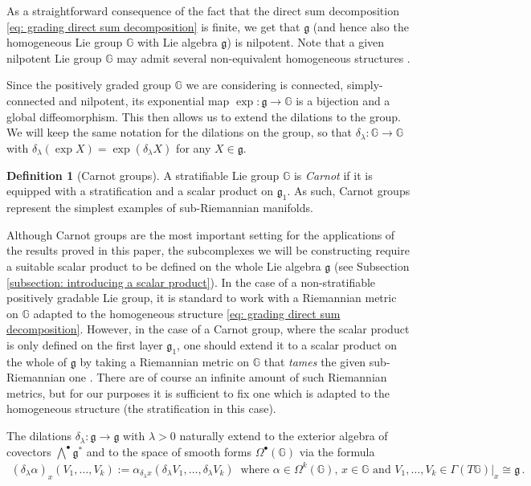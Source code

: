 \documentclass[dvipsnames]{amsart}
\newcommand{\todog}[1]{\todo[inline,backgroundcolor=green!25]{#1}}
\theoremstyle{definition}
\newtheorem{definition}[theorem]{Definition}
\theoremstyle{definition}
\numberwithin{equation}{section}
\newcommand{\G}{\mathbb{G}}
\begin{document}
As a straightforward consequence of the fact that the direct sum decomposition \eqref{eq: grading direct sum decomposition} is finite, we get that $\mathfrak{g}$ (and hence also the homogeneous Lie group $\G$ with Lie algebra $\mathfrak{g}$) is nilpotent. Note that a given {nilpotent} Lie group $\G$ may admit several non-equivalent homogeneous structures \cite{hakavuori2022gradings}.

Since the {positively graded group} $\G$ we are considering is connected, simply-connected and nilpotent, its exponential map $\exp\colon\mathfrak{g}\to\G$ is a bijection and a global diffeomorphism. This then allows us to extend the dilations to the group. We will keep the same notation for the dilations on the group, so that $\delta_\lambda\colon\G\to\G$ with $\delta_\lambda(\exp X)=\exp(\delta_\lambda X)$ for any $X\in\mathfrak{g}$.


\begin{definition}[Carnot groups]\label{def: carnot groups} {A stratifiable Lie group $\G$ is \textit{Carnot} if it is equipped with a stratification} {and a scalar product on $\mathfrak{g}_1$}. As such, Carnot groups represent the simplest examples of {sub-Riemannian manifolds}. 
\end{definition}
Although Carnot groups are the most important setting for the applications of the results proved in this paper, the subcomplexes we will be constructing require a suitable scalar product to be defined on the whole Lie algebra $\mathfrak{g}$ (see Subsection \ref{subsection: introducing a scalar product}). In the case of a non-stratifiable positively gradable Lie group, it is standard to work with a Riemannian metric on $\G$ adapted to the homogeneous structure \eqref{eq: grading direct sum decomposition}. However, in the case of a Carnot group, where the scalar product is only defined on the first layer $\mathfrak{g}_1$, one should extend it to a scalar product on the whole of $\mathfrak{g}$ by taking a Riemannian metric on $\G$ that \textit{tames} the given {sub-Riemannian} one \cite[Chapter 1]{montgomery2002tour}. There are of course an infinite amount of such Riemannian metrics, but for our purposes it is sufficient to fix one which is adapted to the homogeneous structure (the stratification in this case).


The dilations $\delta_\lambda\colon\mathfrak{g}\to\mathfrak{g}$ with $\lambda>0$ naturally extend to the exterior algebra of covectors $\bigwedge^\bullet\mathfrak{g}^\ast$ and to the space of smooth forms $\Omega^\bullet(\G)$ via the formula
\begin{align*}
    \left(\delta_\lambda\alpha\right)_x(V_1,\ldots,V_k):=\alpha_{{\delta_\lambda x}}(\delta_\lambda V_1,\ldots,\delta_\lambda V_k)\ \text{ where }\alpha\in\Omega^k(\G),\,x\in\G\text{ and }V_1,\ldots,V_k\in\Gamma(T\G)\big\vert_x\cong\mathfrak{g}\,.
\end{align*}
\end{document}

